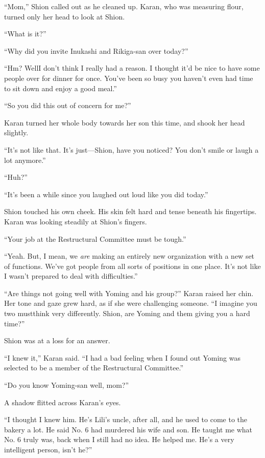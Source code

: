 ``Mom,'' Shion called out as he cleaned up. Karan, who was measuring
flour, turned only her head to look at Shion.

``What is it?''

``Why did you invite Inukashi and Rikiga-san over today?''

``Hm? Well\el I don't think I really had a reason. I thought it'd be
nice to have some people over for dinner for once. You've been so busy
you haven't even had time to sit down and enjoy a good meal.''

``So you did this out of concern for me?''

Karan turned her whole body towards her son this time, and shook her
head slightly.

``It's not like that. It's just---Shion, have you noticed? You don't
smile or laugh a lot anymore.''

``Huh?''

``It's been a while since you laughed out loud like you did today.''

Shion touched his own cheek. His skin felt hard and tense beneath his
fingertips. Karan was looking steadily at Shion's fingers.

``Your job at the Restructural Committee must be tough.''

``Yeah. But, I mean, we \emph{are} making an entirely new organization with a
new set of functions. We've got people from all sorts of positions in
one place. It's not like I wasn't prepared to deal with difficulties.''

``Are things not going well with Yoming and his group?'' Karan raised
her chin. Her tone and gaze grew hard, as if she were challenging
someone. ``I imagine you two must\el think very differently. Shion, are
Yoming and them giving you a hard time?''

Shion was at a loss for an answer.

``I knew it,'' Karan said. ``I had a bad feeling when I found out Yoming
was selected to be a member of the Restructural Committee.''

``Do you know Yoming-san well, mom?''

A shadow flitted across Karan's eyes.

``I thought I knew him. He's Lili's uncle, after all, and he used to
come to the bakery a lot. He said No. 6 had murdered his wife and son.
He taught me what No. 6 truly was, back when I still had no idea. He
helped me. He's a very intelligent person, isn't he?''

